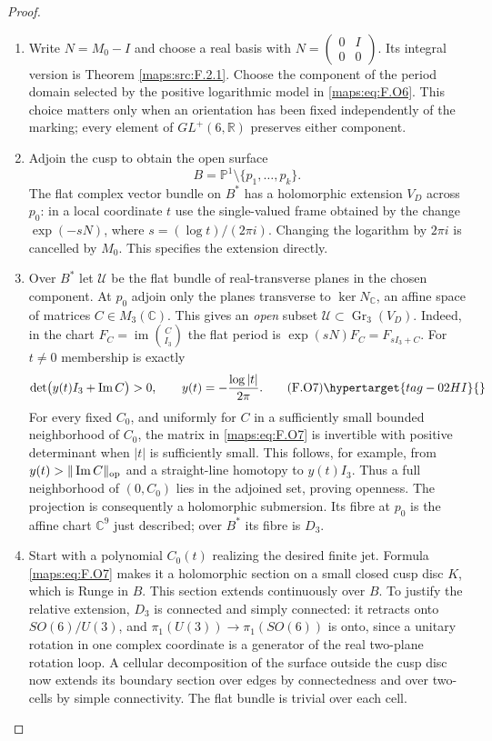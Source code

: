 \begin{proof}
\begin{enumerate}[label={$\langle1\rangle$\arabic*.}]
\item Write $N=M_0-I$ and choose a real basis with
$N=\left(\begin{smallmatrix}0&I\\0&0\end{smallmatrix}\right)$.
Its integral version is Theorem \ref{maps:src:F.2.1}.  Choose the component
of the period domain selected by the positive logarithmic
model in \eqref{maps:eq:F.O6}.  This choice matters only when an orientation
has been fixed independently of the marking; every element
of $GL^+(6,\mathbb R)$ preserves either component.

\item Adjoin the cusp to obtain the open surface
\[
 B=\mathbb P^1\setminus\{p_1,\ldots,p_k\}.
\]
The flat complex vector bundle on $B^*$ has a holomorphic
extension $V_D$ across $p_0$: in a local coordinate $t$ use
the single-valued frame obtained by the change
$\exp(-sN)$, where $s=(\log t)/(2\pi i)$.
Changing the logarithm by $2\pi i$ is cancelled by $M_0$.
This specifies the extension directly.

\item Over $B^*$ let $\mathscr U$ be the flat bundle of real-transverse
planes in the chosen component.  At $p_0$ adjoin only the
planes transverse to $\ker N_\mathbb C$, an affine space of
matrices $C\in M_3(\mathbb C)$.  This gives an \emph{open}
subset $\mathscr U\subset\operatorname{Gr}_3(V_D)$.
Indeed, in the chart $F_C=\operatorname{im}\binom C{I_3}$
the flat period is
$\exp(sN)F_C=F_{sI_3+C}$.  For $t\ne0$ membership is exactly
\[
 \det\bigl(y(t)I_3+\operatorname{Im}C\bigr)>0,
 \qquad y(t)=-\frac{\log|t|}{2\pi}.
 \tag{F.O7}\hypertarget{tag-02HI}{}\label{maps:eq:F.O7}
\]
For every fixed $C_0$, and uniformly for $C$ in a sufficiently
small bounded neighborhood of $C_0$, the matrix in \eqref{maps:eq:F.O7} is
invertible with positive determinant when $|t|$ is sufficiently
small.  This follows, for example, from
$y(t)>\|\operatorname{Im}C\|_{\rm op}$ and a straight-line
homotopy to $y(t)I_3$.  Thus a full neighborhood of
$(0,C_0)$ lies in the adjoined set, proving openness.
The projection is consequently a holomorphic submersion. Its fibre
at $p_0$ is the affine chart $\mathbb C^9$ just described; over
$B^*$ its fibre is $D_3$.

\item Start with a polynomial $C_0(t)$ realizing the desired finite
jet.  Formula \eqref{maps:eq:F.O7} makes it a holomorphic section on a small
closed cusp disc $K$, which is Runge in $B$.
This section extends continuously over $B$.  To justify the
relative extension, $D_3$ is connected and simply connected:
it retracts onto $SO(6)/U(3)$, and
$\pi_1(U(3))\to\pi_1(SO(6))$ is onto, since a unitary rotation
in one complex coordinate is a generator of the real
two-plane rotation loop.  A cellular decomposition of the
surface outside the cusp disc now extends its boundary
section over edges by connectedness and over two-cells by
simple connectivity.  The flat bundle is trivial over each cell.


\end{enumerate}
\end{proof}
